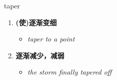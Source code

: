 
\begin{frame}
{\huge taper}
\begin{center}
\begin{enumerate}\Large
  \item \textbf{(使)逐渐变细}
  \begin{itemize}
    \item \em{\Large{taper to a point}}
  \end{itemize}
  \item \textbf{逐渐减少，减弱}
  \begin{itemize}
    \item \em{\Large{the storm finally tapered off}}
  \end{itemize}
\end{enumerate}
\end{center}
\end{frame}
